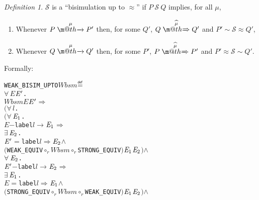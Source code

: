 \documentclass[GCNS]{yincog}
\makeatletter
\renewcommand{\HOLConst}[1]{\texttt{#1}}
\renewcommand{\HOLBoundVar}[1]{\ensuremath{\mathit{#1}}}
\renewcommand{\HOLFreeVar}[1]{\ensuremath{\mathit{#1}}}
\renewcommand{\HOLSymConst}[1]{#1}
\renewcommand{\HOLTokenConj}{\ensuremath{\wedge}}
\renewcommand{\HOLTokenRCompose}{\ensuremath{\circ _r}}
\def \rightarrowfill{$\m@th\mathord{\smash-}\mkern-6mu%
  \cleaders\hbox{$\mkern-2mu\mathord{\smash-}\mkern-2mu$}\hfill
  \mkern-6mu\mathord\rightarrow$}
\def \rightarrowfillWEAK{$\m@th\mathord{\smash=}\mkern-6mu%
  \cleaders\hbox{$\mkern-2mu\mathord{\smash=}\mkern-2mu$}\hfill
  \mkern-6mu\mathord\Rightarrow$}
\renewcommand{\HOLTokenDefEquality}{\ensuremath{\mathrel{\overset{\makebox [0pt]{\text{\tiny \textsf{def}}}}{=}}}}
\renewcommand{\HOLTokenExists}{\ensuremath{\exists \,}}
\renewcommand{\HOLTokenForall}{\ensuremath{\forall \,}}
\theoremstyle{remark}
\newtheorem{definition}{Definition}[section]
\theoremstyle{theorem}
\theoremstyle{remark}
\newcommand{\HOLTokenTransBegin}{$-$}
\newcommand{\HOLTokenTransEnd}{$\rightarrow$\xspace}
\newcommand{\HOLTokenWeakTransBegin}{$=$}
\newcommand{\HOLTokenWeakTransEnd}{$\Rightarrow$\xspace}
\renewcommand{\HOLTokenImp}{\ensuremath{\Longrightarrow}}
\newcommand{\arr}[1]{\mathrel{\stackrel{{\;\;#1\;\;}}{\mbox{\rightarrowfill}}}}
\newcommand{\Arcap}[1]{\mathrel{\stackrel{{\;\;{\widehat{#1}}\;\;}}{\mbox{\rightarrowfillWEAK}}}}
\def\Svtex{\mathcal{S}}
\makeatother
\begin{document}
\begin{definition}%
 \label{def:singleweak}
$\Svtex $ is a ``bisimulation up to $\approx $'' if $P\ \Svtex \ Q$ implies,
for all $\mu $,
%
\begin{enumerate}
%
\item Whenever $P \arr{\mu} P'$ then, for some $Q'$,
$Q \Arcap{\mu} Q'$ and $P' \sim \Svtex \approx Q'$,
%
\item Whenever $Q \arr{\mu} Q'$ then, for some $P'$,
$P \Arcap{\mu} P'$ and $P' \approx \Svtex \sim Q'$.
%
\end{enumerate}
%
Formally:
%
\begin{alltt}
   \HOLConst{WEAK\_BISIM\_UPTO} \HOLFreeVar{Wbsm} \HOLTokenDefEquality{}
     \HOLSymConst{\HOLTokenForall{}}\HOLBoundVar{E} \ensuremath{\HOLBoundVar{E}\sp{\prime}}.
         \HOLFreeVar{Wbsm} \HOLBoundVar{E} \ensuremath{\HOLBoundVar{E}\sp{\prime}} \HOLSymConst{\HOLTokenImp{}}
         \ensuremath{(}\HOLSymConst{\HOLTokenForall{}}\HOLBoundVar{l}.
              \ensuremath{(}\HOLSymConst{\HOLTokenForall{}}\ensuremath{\HOLBoundVar{E}\sb{\mathrm{1}}}.
                   \HOLBoundVar{E} \HOLTokenTransBegin\HOLConst{label} \HOLBoundVar{l}\HOLTokenTransEnd \ensuremath{\HOLBoundVar{E}\sb{\mathrm{1}}} \HOLSymConst{\HOLTokenImp{}}
                   \HOLSymConst{\HOLTokenExists{}}\ensuremath{\HOLBoundVar{E}\sb{\mathrm{2}}}.
                       \ensuremath{\HOLBoundVar{E}\sp{\prime}} \HOLTokenWeakTransBegin\HOLConst{label} \HOLBoundVar{l}\HOLTokenWeakTransEnd \ensuremath{\HOLBoundVar{E}\sb{\mathrm{2}}} \HOLSymConst{\HOLTokenConj{}}
                       \ensuremath{(}\HOLConst{WEAK\_EQUIV} \HOLSymConst{\HOLTokenRCompose{}} \HOLFreeVar{Wbsm} \HOLSymConst{\HOLTokenRCompose{}} \HOLConst{STRONG\_EQUIV}\ensuremath{)} \ensuremath{\HOLBoundVar{E}\sb{\mathrm{1}}} \ensuremath{\HOLBoundVar{E}\sb{\mathrm{2}}}\ensuremath{)} \HOLSymConst{\HOLTokenConj{}}
              \HOLSymConst{\HOLTokenForall{}}\ensuremath{\HOLBoundVar{E}\sb{\mathrm{2}}}.
                  \ensuremath{\HOLBoundVar{E}\sp{\prime}} \HOLTokenTransBegin\HOLConst{label} \HOLBoundVar{l}\HOLTokenTransEnd \ensuremath{\HOLBoundVar{E}\sb{\mathrm{2}}} \HOLSymConst{\HOLTokenImp{}}
                  \HOLSymConst{\HOLTokenExists{}}\ensuremath{\HOLBoundVar{E}\sb{\mathrm{1}}}.
                      \HOLBoundVar{E} \HOLTokenWeakTransBegin\HOLConst{label} \HOLBoundVar{l}\HOLTokenWeakTransEnd \ensuremath{\HOLBoundVar{E}\sb{\mathrm{1}}} \HOLSymConst{\HOLTokenConj{}}
                      \ensuremath{(}\HOLConst{STRONG\_EQUIV} \HOLSymConst{\HOLTokenRCompose{}} \HOLFreeVar{Wbsm} \HOLSymConst{\HOLTokenRCompose{}} \HOLConst{WEAK\_EQUIV}\ensuremath{)} \ensuremath{\HOLBoundVar{E}\sb{\mathrm{1}}} \ensuremath{\HOLBoundVar{E}\sb{\mathrm{2}}}\ensuremath{)} \HOLSymConst{\HOLTokenConj{}}

\end{alltt}
\end{definition}
\end{document}
